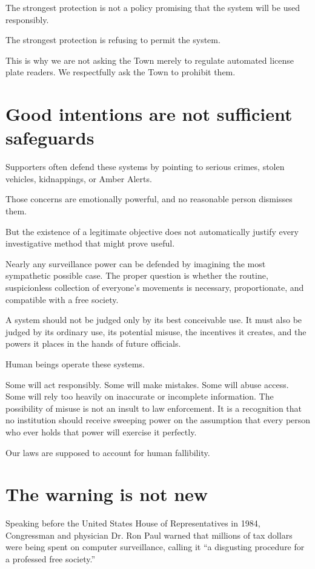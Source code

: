 \documentclass[11pt]{article}
\begin{document}
The strongest protection is not a policy promising that the system will be used responsibly.

The strongest protection is refusing to permit the system.

This is why we are not asking the Town merely to regulate automated license plate readers. We respectfully ask the Town to prohibit them.

\section*{Good intentions are not sufficient safeguards}
\label{sec:org4a22955}

Supporters often defend these systems by pointing to serious crimes, stolen vehicles, kidnappings, or Amber Alerts.

Those concerns are emotionally powerful, and no reasonable person dismisses them.

But the existence of a legitimate objective does not automatically justify every investigative method that might prove useful.

Nearly any surveillance power can be defended by imagining the most sympathetic possible case. The proper question is whether the routine, suspicionless collection of everyone’s movements is necessary, proportionate, and compatible with a free society.

A system should not be judged only by its best conceivable use. It must also be judged by its ordinary use, its potential misuse, the incentives it creates, and the powers it places in the hands of future officials.

Human beings operate these systems.

Some will act responsibly. Some will make mistakes. Some will abuse access. Some will rely too heavily on inaccurate or incomplete information. The possibility of misuse is not an insult to law enforcement. It is a recognition that no institution should receive sweeping power on the assumption that every person who ever holds that power will exercise it perfectly.

Our laws are supposed to account for human fallibility.

\section*{The warning is not new}
\label{sec:org7ef1111}

Speaking before the United States House of Representatives in 1984, Congressman and physician Dr. Ron Paul warned that millions of tax dollars were being spent on computer surveillance, calling it “a disgusting procedure for a professed free society.”
\end{document}
